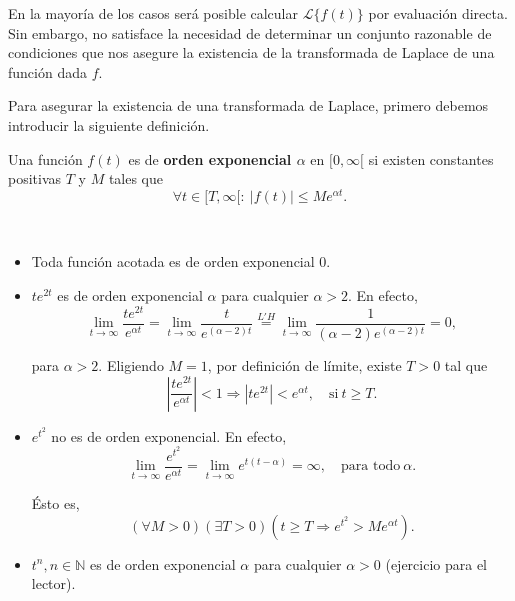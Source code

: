 En la mayoría de los casos será posible calcular $\mathcal{L}\{f(t)\}$ por evaluación directa. Sin embargo, no satisface la necesidad de determinar un conjunto razonable de condiciones que nos asegure la existencia de la transformada de Laplace de una función dada $f$.

Para asegurar la existencia de una transformada de Laplace, primero debemos introducir la siguiente definición.


\begin{defi}
    Una función $f(t)$ es de \textbf{orden exponencial $\alpha$} en $[0,\infty[$ si existen constantes positivas $T$ y $M$ tales que
    $$\forall t \in [T, \infty[: ~ |f(t)| \leq M e^{\alpha t}.$$
\end{defi}

\begin{ejemplo}
\ 

    \begin{itemize}
        \item Toda función acotada es de orden exponencial 0.

        \item $t e^{2t}$ es de orden exponencial $\alpha$ para cualquier $\alpha > 2$. En efecto,
        $$\lim_{t \to \infty} \frac{t e^{2t}}{e^{\alpha t}} = \lim_{t \to \infty} \frac{t}{e^{(\alpha-2) t}} \overset{L'H}{=} \lim_{t \to \infty} \frac{1}{(\alpha -2 )e^{(\alpha-2) t}} = 0,$$

        para $\alpha > 2$. Eligiendo $M = 1$, por definición de límite, existe $T > 0$ tal que 
        $$\left|\frac{t e^{2t}}{e^{\alpha t}} \right| < 1 \Rightarrow |te^{2t}| < e^{\alpha t}, \quad \text{si} ~ t \geq T.$$
        
        \item $e^{t^2}$ no es de orden exponencial. En efecto,
        $$\lim_{t \to  \infty} \frac{e^{t^2}}{e^{\alpha t}} = \lim_{t \to \infty} e^{t(t-\alpha)} = \infty, \quad \mbox{para todo} ~ \alpha.$$

        Ésto es,
        $$(\forall M >0)(\exists T >0)\left(t \geq T \Rightarrow e^{t^2} > M e^{\alpha t}\right).$$

        \item $t^n, n \in \mathbb{N}$ es de orden exponencial $\alpha$ para cualquier $\alpha > 0$ (ejercicio para el lector).
    \end{itemize}
\end{ejemplo}

